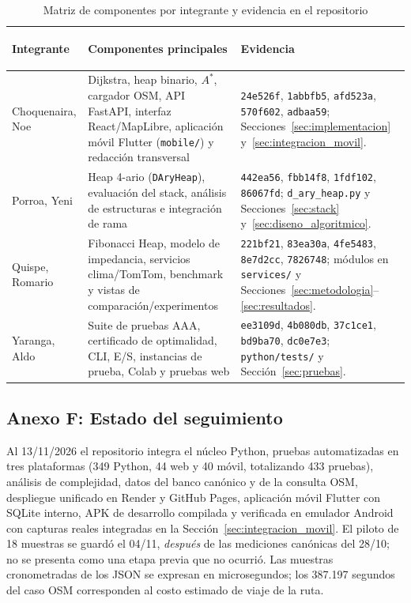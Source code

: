 \begin{table}[H]
    \centering
    \fontsize{9}{11}\selectfont
    \renewcommand{\arraystretch}{1.15}
    \caption{Matriz de componentes por integrante y evidencia en el repositorio}
    \label{tab:contribuciones}
    \begin{tabularx}{\textwidth}{@{}>{\bfseries\raggedright\arraybackslash}p{2.9cm} >{\raggedright\arraybackslash}p{5.5cm} >{\raggedright\arraybackslash}X@{}}
        \toprule
        \textbf{Integrante} & \textbf{Componentes principales} & \textbf{Evidencia} \\
        \midrule
        Choquenaira, Noe & Dijkstra, heap binario, $A^*$, cargador OSM, API FastAPI, interfaz React/MapLibre, aplicación móvil Flutter (\texttt{mobile/}) y redacción transversal & \texttt{24e526f}, \texttt{1abbfb5}, \texttt{afd523a}, \texttt{570f602}, \texttt{adbaa59}; Secciones~\ref{sec:implementacion} y~\ref{sec:integracion_movil}. \\
        Porroa, Yeni & Heap 4-ario (\texttt{DAryHeap}), evaluación del stack, análisis de estructuras e integración de rama & \texttt{442ea56}, \texttt{fbb14f8}, \texttt{1fdf102}, \texttt{86067fd}; \texttt{d\_ary\_heap.py} y Secciones~\ref{sec:stack} y~\ref{sec:diseno_algoritmico}. \\
        Quispe, Romario & Fibonacci Heap, modelo de impedancia, servicios clima/TomTom, benchmark y vistas de comparación/experimentos & \texttt{221bf21}, \texttt{83ea30a}, \texttt{4fe5483}, \texttt{8e7d2cc}, \texttt{7826748}; módulos en \texttt{services/} y Secciones~\ref{sec:metodologia}--\ref{sec:resultados}. \\
        Yaranga, Aldo & Suite de pruebas AAA, certificado de optimalidad, CLI, E/S, instancias de prueba, Colab y pruebas web & \texttt{ee3109d}, \texttt{4b080db}, \texttt{37c1ce1}, \texttt{bd9ba70}, \texttt{dc0e7e3}; \texttt{python/tests/} y Sección~\ref{sec:pruebas}. \\
        \bottomrule
    \end{tabularx}
\end{table}

\subsection*{Anexo F: Estado del seguimiento}
\label{anexo:seguimiento}
Al 13/11/2026 el repositorio integra el núcleo Python, pruebas automatizadas en tres plataformas (349 Python, 44 web y 40 móvil, totalizando 433 pruebas), análisis de complejidad, datos del banco canónico y de la consulta OSM, despliegue unificado en Render y GitHub Pages, aplicación móvil Flutter con SQLite interno, APK de desarrollo compilada y verificada en emulador Android con capturas reales integradas en la Sección~\ref{sec:integracion_movil}. El piloto de 18 muestras se guardó el 04/11, \emph{después} de las mediciones canónicas del 28/10; no se presenta como una etapa previa que no ocurrió. Las muestras cronometradas de los JSON se expresan en microsegundos; los 387.197 segundos del caso OSM corresponden al costo estimado de viaje de la ruta.

